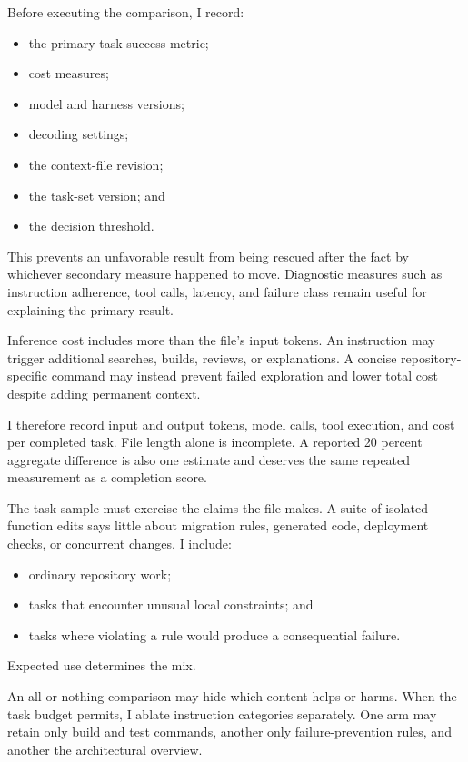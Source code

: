 
Before executing the comparison, I record:

\begin{itemize}
\tightlist
\item
  the primary task-success metric;
\item
  cost measures;
\item
  model and harness versions;
\item
  decoding settings;
\item
  the context-file revision;
\item
  the task-set version; and
\item
  the decision threshold.
\end{itemize}

This prevents an unfavorable result from being rescued after the fact by whichever secondary measure happened to move. Diagnostic measures such as instruction adherence, tool calls, latency, and failure class remain useful for explaining the primary result.

Inference cost includes more than the file's input tokens. An instruction may trigger additional searches, builds, reviews, or explanations. A concise repository-specific command may instead prevent failed exploration and lower total cost despite adding permanent context.

I therefore record input and output tokens, model calls, tool execution, and cost per completed task. File length alone is incomplete. A reported 20 percent aggregate difference is also one estimate and deserves the same repeated measurement as a completion score.


The task sample must exercise the claims the file makes. A suite of isolated function edits says little about migration rules, generated code, deployment checks, or concurrent changes. I include:

\begin{itemize}
\tightlist
\item
  ordinary repository work;
\item
  tasks that encounter unusual local constraints; and
\item
  tasks where violating a rule would produce a consequential failure.
\end{itemize}

Expected use determines the mix.

An all-or-nothing comparison may hide which content helps or harms. When the task budget permits, I ablate instruction categories separately. One arm may retain only build and test commands, another only failure-prevention rules, and another the architectural overview.

